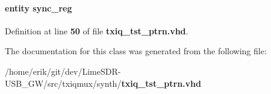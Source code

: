 \paragraph[{sync\+\_\+reg0}]{ {\bfseries \textcolor{keywordflow}{entity}\textcolor{vhdlchar}{ }\textcolor{vhdlchar}{sync\+\_\+reg}\textcolor{vhdlchar}{ }} \hspace{0.3cm}{\ttfamily [Instantiation]}}\label{classtxiq__tst__ptrn_1_1arch_a6d0f2de0bd56b397adfb1e48896e42ef}


Definition at line {\bf 50} of file {\bf txiq\+\_\+tst\+\_\+ptrn.\+vhd}.



The documentation for this class was generated from the following file\+:\begin{DoxyCompactItemize}
\item 
/home/erik/git/dev/\+Lime\+S\+D\+R-\/\+U\+S\+B\+\_\+\+G\+W/src/txiqmux/synth/{\bf txiq\+\_\+tst\+\_\+ptrn.\+vhd}\end{DoxyCompactItemize}
